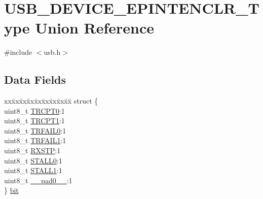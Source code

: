 \hypertarget{union_u_s_b___d_e_v_i_c_e___e_p_i_n_t_e_n_c_l_r___type}{}\section{U\+S\+B\+\_\+\+D\+E\+V\+I\+C\+E\+\_\+\+E\+P\+I\+N\+T\+E\+N\+C\+L\+R\+\_\+\+Type Union Reference}
\label{union_u_s_b___d_e_v_i_c_e___e_p_i_n_t_e_n_c_l_r___type}


{\ttfamily \#include $<$usb.\+h$>$}

\subsection*{Data Fields}
\begin{DoxyCompactItemize}
\item 
\begin{tabbing}
xx\=xx\=xx\=xx\=xx\=xx\=xx\=xx\=xx\=\kill
struct \{\\
\>uint8\_t \mbox{\hyperlink{union_u_s_b___d_e_v_i_c_e___e_p_i_n_t_e_n_c_l_r___type_a7180d96a777e3568fd150aa959df6838}{TRCPT0}}:1\\
\>uint8\_t \mbox{\hyperlink{union_u_s_b___d_e_v_i_c_e___e_p_i_n_t_e_n_c_l_r___type_abfd778fdb9c052b995d0dabc9e75081b}{TRCPT1}}:1\\
\>uint8\_t \mbox{\hyperlink{union_u_s_b___d_e_v_i_c_e___e_p_i_n_t_e_n_c_l_r___type_a3397b91aaffcb46a2422c28eadaf5be7}{TRFAIL0}}:1\\
\>uint8\_t \mbox{\hyperlink{union_u_s_b___d_e_v_i_c_e___e_p_i_n_t_e_n_c_l_r___type_a25eefecf91be8facebc4c383e2339b9b}{TRFAIL1}}:1\\
\>uint8\_t \mbox{\hyperlink{union_u_s_b___d_e_v_i_c_e___e_p_i_n_t_e_n_c_l_r___type_ad58935f35c47fca0b24443107b04a5d7}{RXSTP}}:1\\
\>uint8\_t \mbox{\hyperlink{union_u_s_b___d_e_v_i_c_e___e_p_i_n_t_e_n_c_l_r___type_afd62db615742ff440bf4aa299207317e}{STALL0}}:1\\
\>uint8\_t \mbox{\hyperlink{union_u_s_b___d_e_v_i_c_e___e_p_i_n_t_e_n_c_l_r___type_a8116f0bbd6acc75e21dc07e2734fc26c}{STALL1}}:1\\
\>uint8\_t \mbox{\hyperlink{union_u_s_b___d_e_v_i_c_e___e_p_i_n_t_e_n_c_l_r___type_a8b4eebe79ded0459acec2f4950102ba3}{\_\_pad0\_\_}}:1\\
\} \mbox{\hyperlink{union_u_s_b___d_e_v_i_c_e___e_p_i_n_t_e_n_c_l_r___type_ae8d9694bc7fb8c6dfaf84cc5bee9147e}{bit}}\\


\end{tabbing}
\end{DoxyCompactItemize}
